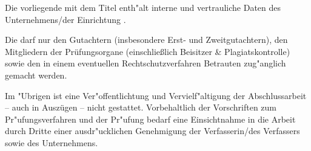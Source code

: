 Die vorliegende \art mit dem Titel \titel enth"alt interne und vertrauliche Daten des Unternehmens/der Einrichtung \unternehmen.

Die \art darf nur den Gutachtern (insbesondere Erst- und Zweitgutachtern), den Mitgliedern der Prüfungsorgane (einschließlich Beisitzer \& Plagiatskontrolle) sowie den in einem eventuellen Rechtschutzverfahren Betrauten zug"anglich gemacht werden.

Im "Ubrigen ist eine Ver"offentlichtung und Vervielf"altigung der Abschlussarbeit -- auch in Auszügen -- nicht gestattet. Vorbehaltlich der Vorschriften zum Pr"ufungsverfahren und der Pr"ufung bedarf eine Einsichtnahme in die Arbeit durch Dritte einer ausdr"ucklichen Genehmigung der Verfasserin/des Verfassers sowie des \oa Unternehmens.

